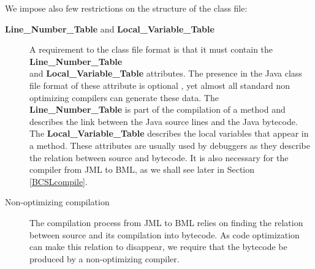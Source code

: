 \begin{description}
     
      
\end{description}



We impose also few restrictions on the structure of the class file:

\begin{description}
  \item [\textbf{Line\_Number\_Table} and \textbf{Local\_Variable\_Table}]
       A requirement to the class file format is that it must contain 
       the \textbf{Line\_Number\_Table} \\ 
       and \textbf{Local\_Variable\_Table}  attributes. The presence in the Java class file format of 
       these attribute is optional \cite{VMSpec}, yet almost all standard non optimizing compilers can generate these data. 
       The \textbf{Line\_Number\_Table} is part of the compilation of a method and 
       describes the link between the Java source lines and the Java bytecode.
       The \textbf{Local\_Variable\_Table} describes the local variables that appear in a method.  
       These attributes are usually used by debuggers as they describe the relation between source and bytecode.
       It is also necessary for the compiler from JML to BML, as we shall see later in Section \ref{BCSLcompile}.

  \item [Non-optimizing compilation] 
       The compilation process from JML to BML relies on finding the relation between source and its compilation into bytecode.
       As code optimization can make this relation to disappear, we require that the bytecode be produced by a non-optimizing
       compiler.
\end{description}





